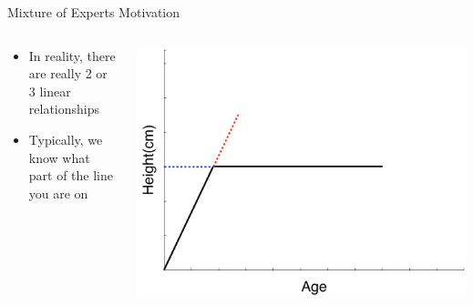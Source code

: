 \documentclass[aspectratio=169]{beamer}
\begin{document}
\begin{frame}{Mixture of Experts Motivation}

\begin{columns}
\begin{column}{0.5\textwidth}
\begin{itemize}
\item In reality, there are really 2 or 3 linear relationships
\item Typically, we know what part of the line you are on
\end{itemize}
\end{column}
\begin{column}{0.5\textwidth}
\includegraphics[width=1\textwidth]{lectMM/ageVsHeightV1.pdf}
\end{column}
\end{columns}
\end{frame}
\end{document}
